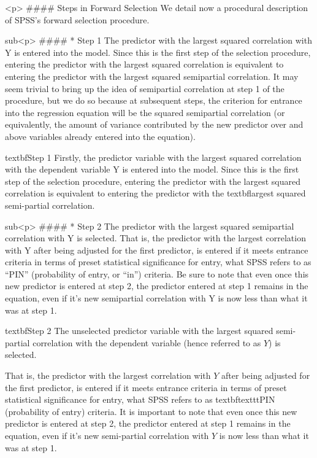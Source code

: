 <p>
#### {Steps in Forward Selection}
We detail now a procedural description of SPSS’s forward selection procedure.

sub<p>
####        * {Step 1}
The predictor with the largest squared correlation with Y is entered into the model. Since this is the first step of the selection procedure, entering the predictor with the largest squared correlation is equivalent to entering the predictor with the largest squared semipartial correlation. It may seem trivial to bring up the idea of semipartial correlation at step 1 of the procedure, but we do so because at subsequent steps, the criterion for entrance into the regression equation will be the squared semipartial correlation (or equivalently, the amount of variance contributed by the new predictor over and above variables already entered into the equation).

textbf{Step 1}
Firstly, the predictor variable with the largest squared correlation with the dependent variable Y is entered into the model. Since this is the first step of the selection procedure, entering the predictor with the largest squared correlation is equivalent to entering the predictor with the textbf{largest squared semi-partial} correlation. 





sub<p>
####        * {Step 2}
The predictor with the largest squared semipartial correlation with Y is selected. That is, the predictor with the largest correlation with Y after being adjusted for the first predictor, is entered if it meets entrance criteria in terms of preset statistical significance for entry, what SPSS refers to as “PIN” (probability of entry, or “in”) criteria. Be sure to note that even once this new predictor is entered at step 2, the predictor entered at step 1 remains in the equation, even if it’s new semipartial correlation with Y is now less than what it was at step 1. 

textbf{Step 2}
The unselected predictor variable with the largest squared semi-partial correlation with the dependent variable (hence referred to as $Y$) is selected. 

That is, the predictor with the largest correlation with $Y$ after being adjusted for the first predictor, is entered if it meets entrance criteria in terms of preset statistical significance for entry, what SPSS refers to as
textbf{texttt{PIN}} (probability of entry) criteria. 
It is important to note that even once this new predictor is entered at step 2, the predictor entered at step 1 remains in the equation, even if it's new semi-partial correlation with $Y$ is now less than what it was at step 1. 

